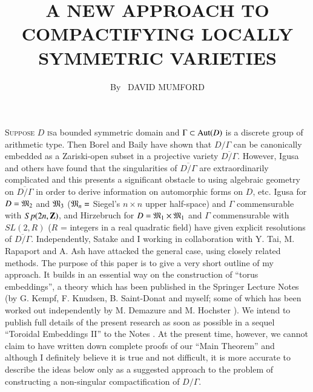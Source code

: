 
\title{A NEW APPROACH TO COMPACTIFYING LOCALLY SYMMETRIC VARIETIES}

\author{By~ DAVID MUMFORD}

\date{}
\maketitle


\setcounter{pageoriginal}{210}

\textsc{Suppose $D$ is}\pageoriginale a bounded symmetric domain and $\Gamma \subset \operatorname{Aut} (D)$ is a discrete group of arithmetic type. Then Borel and Baily \cite{art8-key2} have shown that $D/\Gamma$ can be canonically embedded as a Zariski-open subset in a projective variety $\overline{D/\Gamma}$. However, Igusa  \cite{art8-key6} and others have found that the singularities of $\overline{D/ \Gamma}$ are extraordinarily complicated and this presents a significant obstacle to using algebraic geometry on $\overline{D/ \Gamma}$ in order to derive information on automorphic forms on $D$, etc. Igusa \cite{art8-key7} for $D = \mathfrak{M}_2$ and $\mathfrak{M}_3$ ($\mathfrak{M}_n =$ Siegel's $n \times n$ upper half-space) and $\Gamma$ commensurable with $Sp (2n ,\mathbf{Z})$, and  Hirzebruch \cite{art8-key4} for $D = \mathfrak{M}_1 \times \mathfrak{M}_1$ and $\Gamma$ commensurable with $SL(2, R)$ ($R$ = integers in a real quadratic field) have given explicit resolutions of $\overline{D/ \Gamma}$. Independently, Satake \cite{art8-key9} and I working in collaboration with Y. Tai, M. Rapaport and A. Ash have attacked the general case, using closely related methods. The purpose of this paper is to give a very short outline of my approach. It builds in an essential way on the construction of ``torus embeddings'', a theory which has been published in the Springer Lecture Notes \cite{art8-key8} (by G. Kempf, F. Knudsen, B. Saint-Donat and myself; some of which has been worked out independently by M. Demazure \cite{art8-key3} and M. Hochster \cite{art8-key5}). We intend to publish full details of the present research as soon as possible in a sequel ``Toroidal Embeddings II'' to the Notes \cite{art8-key8}. At the present time, however, we cannot claim to have written down complete proofs of our ``Main Theorem'' and although I definitely believe it is true and not difficult, it is more accurate to describe the ideas below only as a suggested approach to the problem of constructing a non-singular compactification of $D/ \Gamma$.

